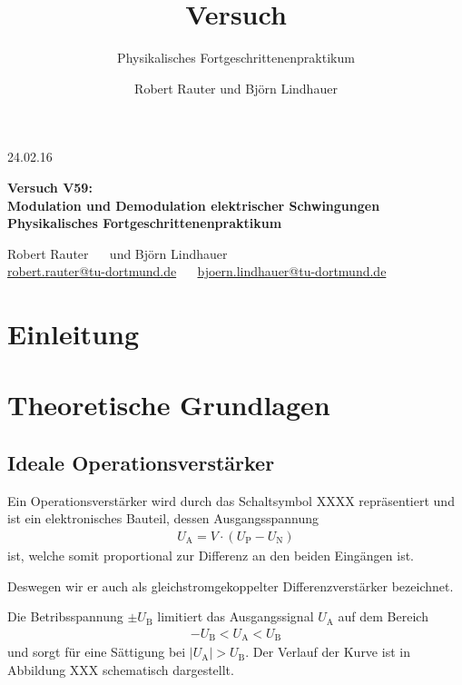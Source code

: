 \documentclass[]{scrartcl}
\title{Versuch \versuchnummer\\ \versuchname}
\subtitle{Physikalisches Fortgeschrittenenpraktikum}
\author{Robert Rauter und Björn Lindhauer}
\date{\versuchdatum}
\newcommand{\versuchnummer}{V59}
\newcommand{\versuchname}{Modulation und Demodulation elektrischer Schwingungen}
\newcommand{\versuchdatum}{24.02.16}
\begin{document}
\begin{titlepage}
{\large \versuchdatum}
\vspace{7cm}
\begin{center}
\textbf{\huge Versuch \versuchnummer:}\\
\vspace{0.5cm}
\textbf{\huge \versuchname}\\
\vspace{0.2cm}
\textbf{ Physikalisches Fortgeschrittenenpraktikum}\\
\vspace{9cm}

{\Large Robert Rauter \ \ \hspace{1.5cm} und \hspace{1.5cm} Björn Lindhauer}\\
{ \url{robert.rauter@tu-dortmund.de} \ \ \hspace{2cm} \url{bjoern.lindhauer@tu-dortmund.de}}
\end{center}
\end{titlepage}
\section{Einleitung}

\section{Theoretische Grundlagen}
\subsection{Ideale Operationsverstärker}
Ein Operationsverstärker wird durch das Schaltsymbol XXXX repräsentiert und ist ein elektronisches Bauteil, dessen Ausgangsspannung
\begin{align}
 U_{\text{A}}=V\cdot \left( U_{\text{P}}-U_{\text{N}} \right)
\end{align}
ist, welche somit proportional zur Differenz an den beiden Eingängen ist.

Deswegen wir er auch als gleichstromgekoppelter Differenzverstärker bezeichnet.

Die Betribsspannung $\pm U_{\text{B}}$ limitiert das Ausgangssignal $U_{\text{A}}$ auf dem Bereich
\begin{align}
 -U_{\text{B}} < U_{\text{A}} < U_{\text{B}}
\end{align}
und sorgt für eine Sättigung bei $\left| U_{\text{A}} \right| > U_{\text{B}}$. Der Verlauf der Kurve ist in Abbildung XXX schematisch dargestellt. 
\end{document}
